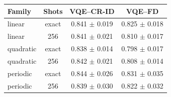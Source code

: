 \begin{tabular}{l c c c}
\hline
Family & Shots & VQE--CR-ID & VQE--FD \\
\hline
linear & exact & 0.841 $\pm$ 0.019 & 0.825 $\pm$ 0.018 \\
linear & 256 & 0.841 $\pm$ 0.021 & 0.810 $\pm$ 0.017 \\
quadratic & exact & 0.838 $\pm$ 0.014 & 0.798 $\pm$ 0.017 \\
quadratic & 256 & 0.842 $\pm$ 0.021 & 0.808 $\pm$ 0.014 \\
periodic & exact & 0.844 $\pm$ 0.026 & 0.831 $\pm$ 0.035 \\
periodic & 256 & 0.839 $\pm$ 0.030 & 0.822 $\pm$ 0.032 \\
\hline
\end{tabular}